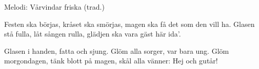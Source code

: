 \begin{song}

\begin{songmeta}
Melodi: Vårvindar friska (trad.)
\end{songmeta}

\begin{songtext}
Festen ska börjas, kråset ska smörjas,
magen ska få det som den vill ha.
Glasen stå fulla, låt sången rulla,
glädjen ska vara gäst här ida'.

Glasen i handen, fatta och sjung.
Glöm alla sorger, var bara ung.
Glöm morgondagen, tänk blott på magen,
skål alla vänner: Hej och gutår!
\end{songtext}
\end{song}
